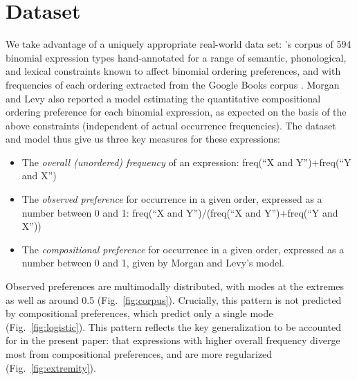 \documentclass{evolang11}
\begin{document}
\section{Dataset}
\label{sec:dataset}
%
We take advantage of a uniquely appropriate real-world data set: 's corpus of 594 binomial expression types hand-annotated for a range of semantic, phonological, and lexical constraints known to affect binomial ordering preferences, and with frequencies of each ordering extracted from the Google Books corpus \cite{Lin:2012te}. Morgan and Levy also reported a model estimating the quantitative compositional ordering preference for each binomial expression, as expected on the basis of the above constraints (independent of actual occurrence frequencies). The dataset and model thus give us three key measures for these expressions:
%
\begin{itemize}
\item The \emph{overall (unordered) frequency} of an expression: freq(``X and Y'')$+$freq(``Y and X'')
\item The \emph{observed preference} for occurrence in a given order, expressed as a number between 0 and 1: freq(``X and Y'')$/$(freq(``X and Y'')$+$freq(``Y and X''))
\item The \emph{compositional preference} for occurrence in a given order, expressed as a number between 0 and 1, given by Morgan and Levy's model.
\end{itemize}
%
Observed preferences are multimodally distributed, with modes at the extremes as well as around 0.5 (Fig.\ \ref{fig:corpus}). Crucially, this pattern is not predicted by compositional preferences, which predict only a single mode (Fig.\ \ref{fig:logistic}). This pattern reflects the key generalization to be accounted for in the present paper: that expressions with higher overall frequency diverge most from compositional preferences, and are more regularized (Fig.\ \ref{fig:extremity}).  

\end{document}
